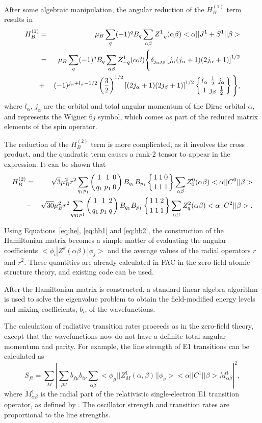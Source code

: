After some algebraic manipulation, the angular reduction of the $H_B^{(1)}$
term results in
\begin{eqnarray}
\label{eq:hb1}
H_B^{(1)} &=& \mu_B\sum_q (-1)^q B_q\sum_{\alpha\beta}
Z^1_{-q}(\alpha\beta)<\alpha||J^1 + S^1||\beta> \nonumber\\
&=& \mu_B\sum_q (-1)^q B_q\sum_{\alpha\beta}Z^1_{-q}(\alpha\beta)
\Bigg\{\delta_{j_\alpha
   j_\beta}\left[j_\alpha(j_\alpha+1)(2j_\alpha+1)\right]^{1/2} \nonumber\\
&+&
(-1)^{j_\alpha+l_\alpha-1/2}\left(\frac{3}{2}\right)^{1/2}
\left[(2j_\alpha+1)(2j_\beta+1)\right]^{1/2}
\sixj{l_\alpha}{\frac{1}{2}}{j_\alpha}{1}{j_\beta}{\frac{1}{2}}\Bigg\},
\end{eqnarray}
where $l_\alpha$, $j_\alpha$ are the orbital and total angular momentum of
the Dirac orbital $\alpha$, and  represents the Wigner
$6j$ symbol, which comes as part of the reduced matrix elements of the spin
operator.

The reduction of the $H_{B}^{(2)}$ term is more complicated, as it involves
the cross product, and the quadratic term causes a rank-2 tensor to
appear in the expression. It can be shown that
\begin{eqnarray}
\label{eq:hb2}
H_B^{(2)} &=& \sqrt{3}\mu_B^2r^2\sum_{q_1p_1}
\threej{1}{1}{0}{q_1}{p_1}{0}B_{q_1}B_{p_1}\sixj{1}{1}{0}{1}{1}{1}
\sum_{\alpha\beta}Z^0_0(\alpha\beta)<\alpha||C^0||\beta>
\nonumber \\
&-&\sqrt{30}\mu_B^2r^2\sum_{qq_1p1}\threej{1}{1}{2}{q_1}{p_1}{q}B_{q_1}B_{p_1}
\sixj{1}{1}{2}{1}{1}{1}
  \sum_{\alpha\beta}Z^2_q(\alpha\beta)<\alpha||C^2||\beta>.
\end{eqnarray}

Using Equations~\ref{eq:he}, \ref{eq:hb1} and \ref{eq:hb2}, the construction
of the Hamiltonian matrix becomes a simple matter of evaluating the angular
coefficients $<\phi_i|Z^k(\alpha\beta)|\phi_j>$ and the average values of the
radial operators $r$ and $r^2$. These quantities are already calculated in FAC
in the zero-field atomic structure theory, and existing code can be used.

After the Hamiltonian matrix is constructed, a standard linear algebra
algorithm is used to solve the eigenvalue problem to obtain the field-modified
energy levels and mixing coefficients, $b_i$, of the wavefunctions.

The calculation of radiative transition rates proceeds as in the zero-field
theory, except that the
wavefunctions now do not have a definite total angular momentum and
parity. For example, the line strength of E1 transitions can be calculated as
\begin{equation}
S_{fi} = \sum_M\left|\sum_{\mu\nu}b_{f\mu}b_{i\nu}\sum_{\alpha\beta}
<\phi_\mu||Z^1_M(\alpha,\beta)||\phi_\nu><\alpha||C^1||\beta>
M^1_{\alpha\beta}\right|^2 ,
\end{equation}
where $M^1_{\alpha\beta}$ is the radial part of the relativistic
single-electron E1 transition operator, as defined by \citet{grant74}. The
oscillator strength and transition rates are proportional to the line
strengths.

